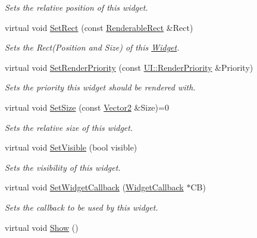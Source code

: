 \begin{DoxyCompactItemize}
\begin{DoxyCompactList}\small\item\em Sets the relative position of this widget. \item\end{DoxyCompactList}\item 
virtual void \hyperlink{classMezzanine_1_1UI_1_1Widget_aed66a04577944a3c76e628185aa7bb3e}{SetRect} (const \hyperlink{structMezzanine_1_1UI_1_1RenderableRect}{RenderableRect} \&Rect)
\begin{DoxyCompactList}\small\item\em Sets the Rect(Position and Size) of this \hyperlink{classMezzanine_1_1UI_1_1Widget}{Widget}. \item\end{DoxyCompactList}\item 
virtual void \hyperlink{classMezzanine_1_1UI_1_1Widget_ad8ebbc46cf1331e8ac6ef310d75e1ee3}{SetRenderPriority} (const \hyperlink{namespaceMezzanine_1_1UI_ac4c753eb6b5d66350a243acc9ce54130}{UI::RenderPriority} \&Priority)
\begin{DoxyCompactList}\small\item\em Sets the priority this widget should be rendered with. \item\end{DoxyCompactList}\item 
virtual void \hyperlink{classMezzanine_1_1UI_1_1Widget_adf8b14ce6641d4ec12f6ff09814fc9ab}{SetSize} (const \hyperlink{classMezzanine_1_1Vector2}{Vector2} \&Size)=0
\begin{DoxyCompactList}\small\item\em Sets the relative size of this widget. \item\end{DoxyCompactList}\item 
virtual void \hyperlink{classMezzanine_1_1UI_1_1Widget_ad13df3d78b4e7cebfc566dc678706915}{SetVisible} (bool visible)
\begin{DoxyCompactList}\small\item\em Sets the visibility of this widget. \item\end{DoxyCompactList}\item 
virtual void \hyperlink{classMezzanine_1_1UI_1_1Widget_a7cab967bfe466c1f2796cc17559ca1f3}{SetWidgetCallback} (\hyperlink{classMezzanine_1_1UI_1_1WidgetCallback}{WidgetCallback} $\ast$CB)
\begin{DoxyCompactList}\small\item\em Sets the callback to be used by this widget. \item\end{DoxyCompactList}\item 
\hypertarget{classMezzanine_1_1UI_1_1Widget_a863195baafaee7ab8a0887c660525bf6}{
virtual void \hyperlink{classMezzanine_1_1UI_1_1Widget_a863195baafaee7ab8a0887c660525bf6}{Show} ()}
\label{classMezzanine_1_1UI_1_1Widget_a863195baafaee7ab8a0887c660525bf6}


\end{DoxyCompactItemize}
